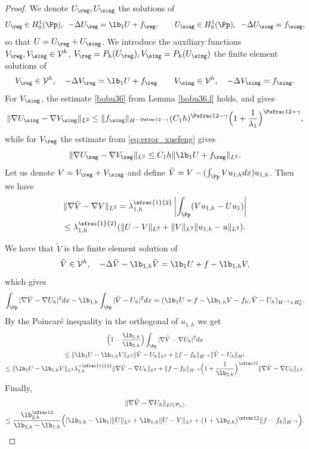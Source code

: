\begin{proof}
We denote $U_{\reg}, U_{\sing}$ the solutions of
\[
U_{\reg} \in H^1_0(\Pp), \;\; -\Delta U_{\reg}= \lb_1 U+ f_{\reg}, \qquad U_{\sing}\in H^1_0(\Pp),\;\; -\Delta U_{\sing} = f_{\sing},
\]
so that $U=U_{\reg}+U_{\sing}$. We introduce the auxiliary functions
$V_{\reg}, V_{\sing} \in \mathcal V^h$, $V_{\reg}=P_h(U_{\reg}), V_{\sing}=P_h(U_{\sing})$ the finite element solutions of
\[
V_{\reg}\in \mathcal V^h, \quad -\Delta V_{\reg} = \lb_1 U +f_{\reg} \qquad V_{\sing} \in \mathcal V^h, \quad -\Delta V_{\sing}= f_{\sing}.
\]
For $V_{\sing}$, the estimate \eqref{bobu36} from Lemma \ref{bobu36.l} holds, and gives
\[
\|\nabla U_{\sing}-\nabla V_{\sing}\|_{L^2} \le \|f_{\sing}\|_{H^{-\Psfrac 12 -\gamma}} (C_1 h)^{\Psfrac 12 -\gamma}\Bigl(1+\frac {1}{\lambda_1}\Bigr)^{\Psfrac 12 +\gamma},
\]
while for $V_{\reg}$ the estimate from \eqref{eq:error_xuefeng} gives
\[
\|\nabla U_{\reg}- \nabla V_{\reg} \|_{L^2} \le C_1 h \| \lb_1 U+ f_{\reg}\|_{L^2}.
\]
Let us denote $V=V_{\reg}+V_{\sing}$ and define $\tilde V= V-(\int_{\Pp} Vu_{1,h} dx) u_{1,h}$. Then we have
\vspace*{-5pt}
\begin{multline}\label{bobu80}
\|\nabla \tilde V-\nabla V\|_{L^2} = \lambda_{1,h}^{\sfrac{1}{2}}
\left|\int_{\Pp} (Vu_{1,h} -Uu_1) \right|\\
\leq \lambda_{1,h}^{\sfrac{1}{2}}(\|U-V\|_{L^2}+\|V\|_{L^2}\|u_{1,h}-u\|_{L^2}).
\end{multline}

We have that $\tilde V$ is the finite element solution of
\[
\tilde V \in \mathcal V^h, \quad -\Delta \tilde V-\lb_{1,h} \tilde V= \lb_1 U +f- \lb_{1,h} V,
\]
which gives
\[
\int_{\Pp} |\nabla \tilde V -\nabla U_h|^2 dx - \lb_{1,h}\int_{\Pp} | \tilde V -U_h|^2 dx= (\lb_1 U +f- \lb_{1,h} V-f_h, \tilde V-U_h)_{H^{-1}\times H^1_0}.
\]
By the Poincaré inequality in the orthogonal of $u_{1,h}$ we get
\vspace*{-5pt}
\begin{multline*}
\Bigl(1- \frac{\lb_{1,h}}{\lb_{2,h}} \Bigr) \int_{\Pp} |\nabla \tilde V -\nabla U_h|^2 dx \\
\le \|\lb_1 U-\lb_{1,h} V\|_{L^2}\| \tilde V-U_h\|_{L^2}+ \|f-f_h\|_{H^{-1}} \| \tilde V - U_h\|_{H^1}\\
\le \|\lb_1 U-\lb_{1,h} V\|_{L^2} \lambda_{2,h}^{-\sfrac{1}{2}} \| \nabla \tilde V-\nabla U_h\|_{L^2}+ \|f-f_h\|_{H^{-1}}\Bigl(1+\frac{1}{\lb_{2,h}}\Bigr)^{\sfrac 12} \| \nabla \tilde V-\nabla U_h\|_{L^2}.
\end{multline*}
Finally,
\vspace*{-5pt}
\begin{multline}\label{bobu81}
\| \nabla \tilde V-\nabla U_h\|_{L^2(\mathcal P_n)}\\
\le \frac{\lb_{2,h}^{\sfrac 12}}{\lb_{2,h}-\lb_{1,h}} \Big (|\lb_{1,h}-\lb_1| \|U\|_{L^2} + \lb_{1,h}\|U-V\|_{L^2}+ (1+ \lb_{2,h})^{\sfrac 12}\|f-f_h\|_{H^{-1}}\Big).\qedhere
\end{multline}
\end{proof}

